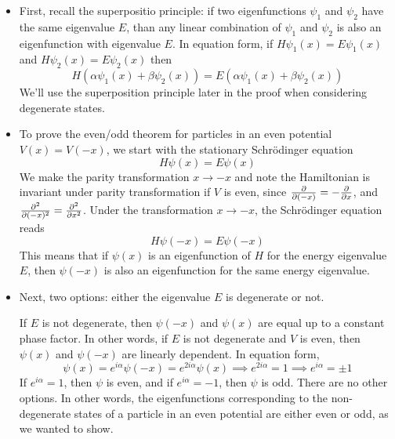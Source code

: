 \documentclass[11pt, a4paper]{article}
\newcommand{\schro}{Schr\"{o}dinger\xspace}
\begin{document}
\begin{itemize}
	\item First, recall the superpositio principle: if two eigenfunctions $ \psi_{1} $ and $ \psi_{2} $ have the same eigenvalue $ E $, than any linear combination of $ \psi_{1} $ and $ \psi_{2} $ is also an eigenfunction with eigenvalue $ E $. In equation form, if $ H\psi_{1}(x) = E \psi_{1}(x) $ and $ H\psi_{2}(x) = E \psi_{2}(x) $ then
	\begin{equation*}
		H\left(\alpha \psi_{1}(x) + \beta \psi_{2}(x)\right) = E \left(\alpha \psi_{1}(x) + \beta \psi_{2}(x)\right)
	\end{equation*}
	We'll use the superposition principle later in the proof when considering degenerate states.

	\item To prove the even/odd theorem for particles in an even potential $ V(x) = V(-x) $, we start with the stationary \schro equation
	\begin{equation*}
		H\psi(x) = E \psi(x)
	\end{equation*}
	We make the parity transformation $ x \to -x $ and note the Hamiltonian is invariant under parity transformation if $ V $ is even, since $ \pdv{}{(-x)} = - \pdv{}{x} $, and $ \pdv[2]{}{(-x)} = \pdv[2]{}{x} $. Under the transformation $ x \to -x $, the \schro equation reads
	\begin{equation*}
		H\psi(-x) = E\psi(-x)
	\end{equation*}
	This means that if $ \psi(x) $ is an eigenfunction of $ H $ for the energy eigenvalue $ E $, then $ \psi(-x) $ is also an eigenfunction for the same energy eigenvalue.
	
	\item Next, two options: either the eigenvalue $ E $ is degenerate or not.
	
	If $ E $ is not degenerate, then $ \psi(-x) $ and  $\psi(x) $ are equal up to a constant phase factor. In other words, if $ E $ is not degenerate and $ V $ is even, then $ \psi(x) $ and $ \psi(-x) $ are linearly dependent. In equation form,
	\begin{equation*}
		 \psi(x) = e^{i\alpha}\psi(-x) = e^{2i\alpha}\psi(x) \implies e^{2i\alpha} = 1 \implies e^{i\alpha} = \pm 1
	\end{equation*}
	If $ e^{i\alpha} = 1 $, then $ \psi $ is even, and if $ e^{i\alpha} = - 1 $, then $ \psi $ is odd. There are no other options. In other words, the eigenfunctions corresponding to the non-degenerate states of a particle in an even potential are either even or odd, as we wanted to show.
	

\end{itemize}
\end{document}
